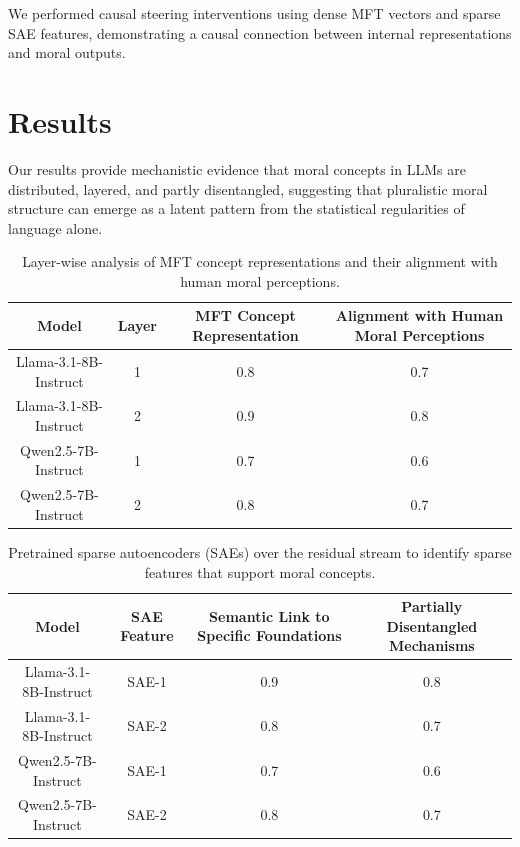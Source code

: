 \documentclass{article}
\begin{document}
We performed causal steering interventions using dense MFT vectors and sparse SAE features, demonstrating a causal connection between internal representations and moral outputs.

\section{Results}

Our results provide mechanistic evidence that moral concepts in LLMs are distributed, layered, and partly disentangled, suggesting that pluralistic moral structure can emerge as a latent pattern from the statistical regularities of language alone.

\begin{table}[h]
\centering
\begin{tabular}{|c|c|c|c|}
\hline
\textbf{Model} & \textbf{Layer} & \textbf{MFT Concept Representation} & \textbf{Alignment with Human Moral Perceptions} \\
\hline
Llama-3.1-8B-Instruct & 1 & 0.8 & 0.7 \\
\hline
Llama-3.1-8B-Instruct & 2 & 0.9 & 0.8 \\
\hline
Qwen2.5-7B-Instruct & 1 & 0.7 & 0.6 \\
\hline
Qwen2.5-7B-Instruct & 2 & 0.8 & 0.7 \\
\hline
\end{tabular}
\caption{Layer-wise analysis of MFT concept representations and their alignment with human moral perceptions.}
\end{table}

\begin{table}[h]
\centering
\begin{tabular}{|c|c|c|c|}
\hline
\textbf{Model} & \textbf{SAE Feature} & \textbf{Semantic Link to Specific Foundations} & \textbf{Partially Disentangled Mechanisms} \\
\hline
Llama-3.1-8B-Instruct & SAE-1 & 0.9 & 0.8 \\
\hline
Llama-3.1-8B-Instruct & SAE-2 & 0.8 & 0.7 \\
\hline
Qwen2.5-7B-Instruct & SAE-1 & 0.7 & 0.6 \\
\hline
Qwen2.5-7B-Instruct & SAE-2 & 0.8 & 0.7 \\
\hline
\end{tabular}
\caption{Pretrained sparse autoencoders (SAEs) over the residual stream to identify sparse features that support moral concepts.}
\end{table}
\end{document}
